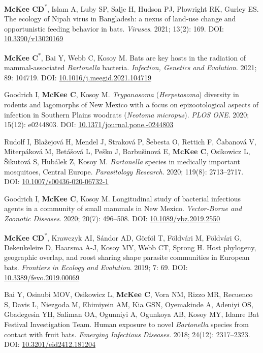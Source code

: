 \documentclass{cv}
\begin{document}
\begin{pubenum}
\item \textbf{McKee CD}\textsuperscript{*}, Islam A, Luby SP, Salje H, Hudson PJ, Plowright RK, Gurley ES. The ecology of Nipah virus in Bangladesh: a nexus of land-use change and opportunistic feeding behavior in bats. \textit{Viruses}. 2021; 13(2): 169. DOI: \href{https://doi.org/10.3390/v13020169}{10.3390/v13020169}

\item \textbf{McKee C}\textsuperscript{*}, Bai Y, Webb C, Kosoy M. Bats are key hosts in the radiation of mammal-associated \textit{Bartonella} bacteria. \textit{Infection, Genetics and Evolution}. 2021; 89: 104719. DOI: \href{https://doi.org/10.1016/j.meegid.2021.104719}{10.1016/j.meegid.2021.104719}

\item Goodrich I, \textbf{McKee C}, Kosoy M. \textit{Trypanosoma} (\textit{Herpetosoma}) diversity in rodents and lagomorphs of New Mexico with a focus on epizootological aspects of infection in Southern Plains woodrats (\textit{Neotoma micropus}). \textit{PLOS ONE}. 2020; 15(12): e0244803. DOI: \href{https://doi.org/10.1371/journal.pone.0244803}{10.1371/journal.pone.-0244803}

\item Rudolf I, Blažejová H, Mendel J, Straková P, Šebesta O, Rettich F, Čabanová V, Miterpáková M, Betášová L, Peško J, Barbušinová E, \textbf{McKee C}, Osikowicz L, Šikutová S, Hubálek Z, Kosoy M. \textit{Bartonella} species in medically important mosquitoes, Central Europe. \textit{Parasitology Research}. 2020; 119(8): 2713--2717. DOI: \href{https://doi.org/10.1007/s00436-020-06732-1}{10.1007/s00436-020-06732-1}

\item Goodrich I, \textbf{McKee C}, Kosoy M. Longitudinal study of bacterial infectious agents in a community of small mammals in New Mexico. \textit{Vector-Borne and Zoonotic Diseases}. 2020; 20(7): 496--508. DOI: \href{https://doi.org/10.1089/vbz.2019.2550}{10.1089/vbz.2019.2550}

\item \textbf{McKee CD}\textsuperscript{*}, Krawczyk AI, Sándor AD, Görföl T, Földvári M, Földvári G, Dekeukeleire D, Haarsma A-J, Kosoy MY, Webb CT, Sprong H. Host phylogeny, geographic overlap, and roost sharing shape parasite communities in European bats. \textit{Frontiers in Ecology and Evolution}. 2019; 7: 69. DOI: \href{https://doi.org/10.3389/fevo.2019.00069}{10.3389/fevo.2019.00069}

\item Bai Y, Osinubi MOV, Osikowicz L, \textbf{McKee C}, Vora NM, Rizzo MR, Recuenco S, Davis L, Niezgoda M, Ehimiyein AM, Kia GSN, Oyemakinde A, Adeniyi OS, Gbadegesin YH, Saliman OA, Ogunniyi A, Ogunkoya AB, Kosoy MY, Idanre Bat Festival Investigation Team. Human exposure to novel \textit{Bartonella} species from contact with fruit bats. \textit{Emerging Infectious Diseases}. 2018; 24(12): 2317--2323. DOI: \href{https://doi.org/10.3201/eid2412.181204}{10.3201/eid2412.181204}


\end{pubenum}
\end{document}
